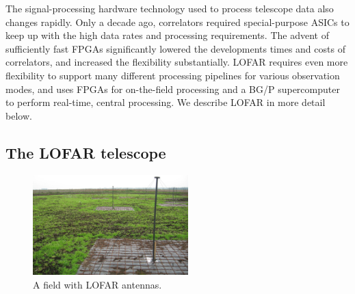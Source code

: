 \documentclass{article}
\begin{document}
The signal-processing hardware technology used to process telescope
data also changes rapidly.  Only a decade ago, correlators required
special-purpose ASICs to keep up with the high data rates and
processing requirements.  The advent of sufficiently fast FPGAs
significantly lowered the developments times and costs of
correlators, and increased the flexibility
substantially. LOFAR requires even more flexibility to support many
different processing pipelines for various observation modes, and uses
FPGAs for on-the-field processing and a BG/P
supercomputer to perform real-time, central processing.
We describe LOFAR in more detail below.



\subsection{The LOFAR telescope}

\begin{figure}[h]
\vspace{-0.4cm}
\begin{center}
\includegraphics[width=60mm]{figures/LBA-field.jpg}
\end{center}
\vspace{-0.5cm}
\caption{A field with LOFAR antennas.}
\label{fig:lba-field}
\end{figure}
\end{document}
